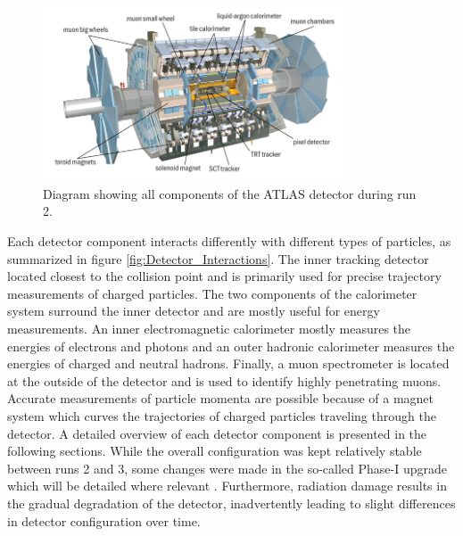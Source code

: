 \begin{figure}[h!]
\centering
    \includegraphics[width=0.8\textwidth]{images/ATLAS_Detector.jpg}
    \caption{Diagram showing all components of the ATLAS detector during run 2.}
    \label{fig:ATLAS_Detector}
\end{figure}

Each detector component interacts differently with different types of particles, as summarized in figure 
\ref{fig:Detector_Interactions}. The inner tracking detector located closest to the collision point and is primarily used for 
precise trajectory measurements of charged particles. The two components of the calorimeter system surround the inner detector 
and are mostly useful for energy measurements. An inner electromagnetic calorimeter mostly measures the energies of electrons 
and photons and an outer hadronic calorimeter measures the energies of charged and neutral hadrons. Finally, a muon spectrometer 
is located at the outside of the detector and is used to identify highly penetrating muons. Accurate measurements of particle 
momenta are possible because of a magnet system which curves the trajectories of charged particles traveling through the detector. 
A detailed overview of each detector component is presented in the following sections. While the overall configuration was kept 
relatively stable between runs 2 and 3, some changes were made in the so-called Phase-I upgrade which will be detailed where 
relevant \cite{atlas-run3-setup}. Furthermore, radiation damage results in the gradual degradation of the detector, inadvertently 
leading to slight differences in detector configuration over time.


